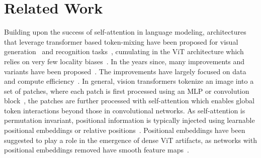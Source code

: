 \vspace{-.2cm}
\section{Related Work}
\vspace{-.2cm}

 Building upon the success of self-attention in language modeling, architectures that leverage transformer based token-mixing have been proposed for visual generation~\citep{parmar2018image,child2019generating,chang2022maskgit} and recognition tasks~\citep{ramachandran2019stand,cordonnier2019relationship}, cumulating in the ViT architecture which relies on very few locality biases~\citep{dosovitskiy2020image}. In the years since, many improvements and variants have been proposed~\citep{nauen2025transformer, vaswani2021scaling,tolstikhin2021mlp,bello2021lambdanetworks,tay2021synthesizer,touvron2021going}. The improvements have largely focused on data~\citep{pmlr-v139-touvron21a} and compute efficiency~\citep{tay2020sparse,choromanski2020rethinking,liu2021swin,ali2021xcit,roy2021efficient,zhou2021informer,yin2022vit,yao2022wave,liang2022not}. In general, vision transformers tokenize an image into a set of patches, where each patch is first processed using an MLP or convolution block~\cite{wu2021cvt,yuan2021tokens,chen2021visformer,chen2021crossvit}, the patches are further processed with self-attention which enables global token interactions beyond those in convolutional networks. As self-attention is permutation invariant, positional information is typically injected using learnable positional embeddings or relative positions~\citep{gehring2017convolutional, su2024roformer,fang2024eva,liu2021swin,lu2024fit,lu2024unified,kim2023region}. Positional embeddings have been suggested to play a role in the emergence of dense ViT artifacts, as networks with positional embeddings removed have smooth feature maps~\citep{yang2024denoising}.

\vspace{-.2cm}

\vspace{-.2cm}

